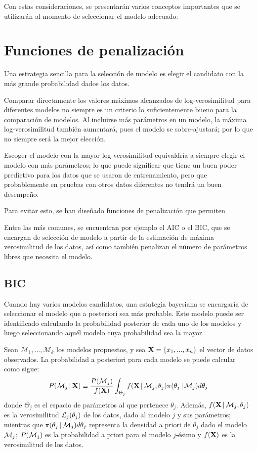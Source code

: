 Con estas consideraciones, se presentarán varios conceptos importantes que se utilizarán al momento de seleccionar el modelo adecuado:

\section{Funciones de penalización}

Una estrategia sencilla para la selección de modelo es elegir el candidato con la más grande probabilidad dados los datos. 

Comparar directamente los valores máximos alcanzados de log-verosimilitud para diferentes modelos no siempre es un criterio lo suficientemente bueno para la comparación de modelos. Al incluirse más parámetros en un modelo, la máxima log-verosimilitud también aumentará, pues el modelo se sobre-ajustará; por lo que no siempre será la mejor elección. 

Escoger el modelo con la mayor log-verosimilitud equivaldría a siempre elegir el modelo con más parámetros; lo que puede significar que tiene un buen poder predictivo para los datos que se usaron de entrenamiento, pero que probablemente en pruebas con otros datos diferentes no tendrá un buen desempeño.

Para evitar esto, se han diseñado funciones de penalización que permiten 

Entre las más comunes, se encuentran por ejemplo el \acf{AIC} o el \acf{BIC}, que se encargan de selección de modelo a partir de la estimación de máxima verosimilitud de los datos, así como también penalizan el número de parámetros libres que necesita el modelo.

\subsection{BIC}

Cuando hay varios modelos candidatos, una estategia bayesiana se encargaría de seleccionar el modelo que a posteriori sea más probable. Este modelo puede ser identificado calculando la probabilidad posterior de cada uno de los modelos y luego seleccionando aquél modelo cuya probabilidad sea la mayor.

Sean $\mathcal{M}_1, ..., \mathcal{M}_k$ los modelos propuestos, y sea $\textbf{X} = \lbrace x_1, ..., x_n \rbrace $ el vector de datos observados. La probabilidad a posteriori para cada modelo se puede calcular como sigue: 
\begin{equation}
P(\mathcal{M}_j \,|\, \textbf{X}) \equiv \frac{P(\mathcal{M}_j)}{f(\textbf{X})} 
  \int_{\Theta_j} f(\textbf{X} \,|\, \mathcal{M}_j, \theta_j) \pi(\theta_j \,|\, \mathcal{M}_j) d\theta_j
\label{eqn:4-1}
\end{equation}
donde $\Theta_j$ es el espacio de parámetros al que pertenece $\theta_j$. Además, $f(\textbf{X} \,|\, \mathcal{M}_j, \theta_j)$ es la verosimilitud $\mathcal{L}_{j}(\theta_j)$ de los datos, dado al modelo $j$ y sus parámetros; mientras que $ \pi(\theta_j \,|\, \mathcal{M}_j) d\theta_j$ representa la densidad a priori de $\theta_j$ dado el modelo $\mathcal{M}_j$; 
$P(\mathcal{M}_j)$ es la probabilidad a priori para el modelo $j$-ésimo y $f(\textbf{X})$ es la verosimilitud de los datos.

